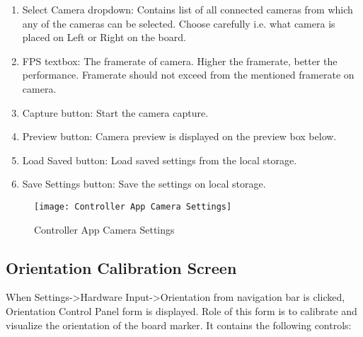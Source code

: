 \begin{enumerate}

\item Select Camera dropdown: Contains list of all connected cameras from which any of the cameras can be selected. Choose carefully i.e. what camera is placed on Left or Right on the board.
\item FPS textbox: The framerate of camera. Higher the framerate, better the performance. Framerate should not exceed from the mentioned framerate on camera.
\item Capture button: Start the camera capture.
\item Preview button: Camera preview is displayed on the preview box below.
\item Load Saved button: Load saved settings from the local storage.
\item Save Settings button: Save the settings on local storage.

\end{enumerate}


\begin{figure}[h]
  \centering
  \texttt{[image: Controller App Camera Settings]}
  \caption{Controller App Camera Settings}
\end{figure}

\subsection{Orientation Calibration Screen}
When Settings->Hardware Input->Orientation from navigation bar is clicked, Orientation Control Panel form is displayed. Role of this form is to calibrate and visualize the orientation of the board marker. It contains the following controls:

